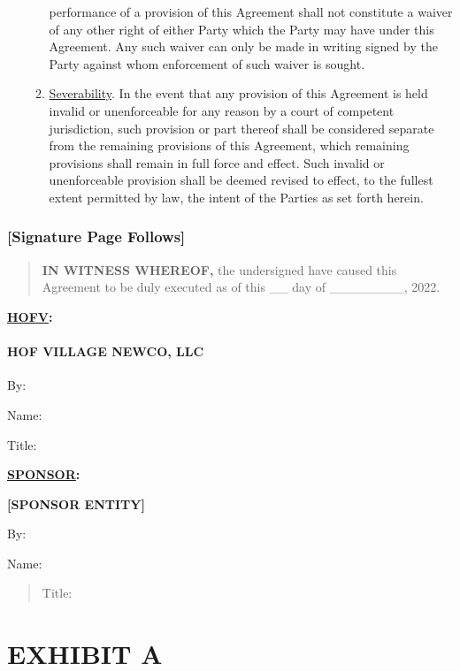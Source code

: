 \documentclass[]{article}
\begin{document}
\begin{enumerate}
\begin{enumerate}
    performance of a provision of this Agreement shall not constitute a
    waiver of any other right of either Party which the Party may have
    under this Agreement. Any such waiver can only be made in writing
    signed by the Party against whom enforcement of such waiver is
    sought.
  \item
    \uline{Severability}. In the event that any provision of this
    Agreement is held invalid or unenforceable for any reason by a court
    of competent jurisdiction, such provision or part thereof shall be
    considered separate from the remaining provisions of this Agreement,
    which remaining provisions shall remain in full force and effect.
    Such invalid or unenforceable provision shall be deemed revised to
    effect, to the fullest extent permitted by law, the intent of the
    Parties as set forth herein.
  \end{enumerate}
\end{enumerate}

\hypertarget{signature-page-follows}{%
\subsubsection{{[}Signature Page
Follows{]}}\label{signature-page-follows}}

\begin{quote}
\textbf{IN WITNESS WHEREOF,} the undersigned have caused this Agreement
to be duly executed as of this \_\_ day of \_\_\_\_\_\_\_\_, 2022.
\end{quote}

\textbf{\uline{HOFV}:}

\hypertarget{hof-village-newco-llc}{%
\paragraph{\texorpdfstring{\textbf{HOF VILLAGE NEWCO, LLC}
}{HOF VILLAGE NEWCO, LLC }}\label{hof-village-newco-llc}}

By:

Name:

Title:

\textbf{\uline{SPONSOR}:}

\textbf{{[}SPONSOR ENTITY{]}}

By:

Name:

\begin{quote}
Title:
\end{quote}

\hypertarget{exhibit-a}{%
\section{EXHIBIT A}\label{exhibit-a}}
\end{document}
